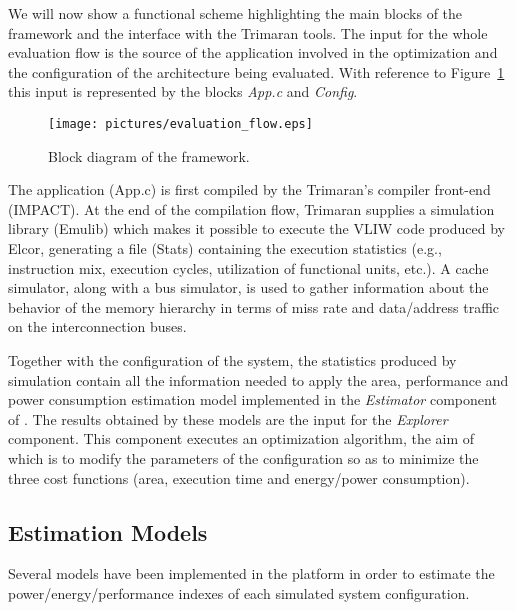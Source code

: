 We will now show a functional scheme highlighting the main blocks of
the \ee{} framework and the interface with the Trimaran tools. The
input for the whole evaluation flow is the source of the application
involved in the optimization and the configuration of the architecture
being evaluated.  With reference to Figure~\ref{fig:evaluation_flow}
this input is represented by the blocks \emph{App.c} and
\emph{Config}.
\begin{figure}
        \centering
        \texttt{[image: pictures/evaluation\_flow.eps]}
        \caption{Block diagram of the framework.}
        \label{fig:evaluation_flow}
\end{figure}

The application (App.c) is first compiled by the Trimaran's compiler
front-end (IMPACT). At the end of the compilation flow,
Trimaran supplies a simulation library (Emulib) which makes it
possible to execute the VLIW code produced by Elcor, generating a file
(Stats) containing the execution statistics (e.g., instruction mix,
execution cycles, utilization of functional units, etc.). A cache
simulator, along with a bus simulator, is used to gather information
about the behavior of the memory hierarchy in terms of miss rate and
data/address traffic on the interconnection buses.

Together with the configuration of the system, the statistics produced
by simulation contain all the information needed to apply the area,
performance and power consumption estimation model implemented in the
\emph{Estimator} component of \ee{}. The results obtained by these
models are the input for the \emph{Explorer} component. This component
executes an optimization algorithm, the aim of which is to modify the
parameters of the configuration so as to minimize the three cost
functions (area, execution time and energy/power consumption).

\subsection{Estimation Models}
Several models have been implemented in the \ee{} platform in order to
estimate the power/energy/performance indexes of each simulated system
configuration.

